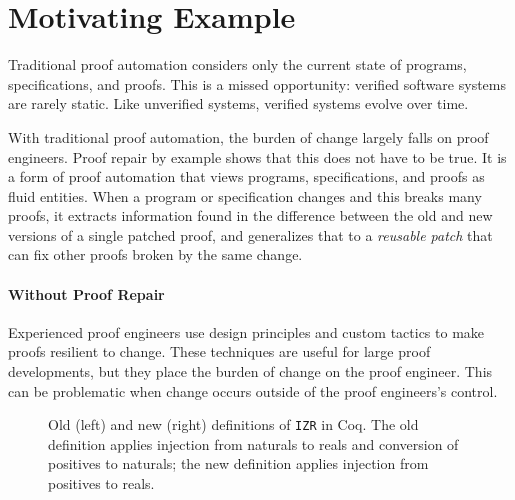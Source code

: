 \section{Motivating Example}
\label{sec:patch-motivating}


Traditional proof automation considers only the current state of programs, specifications, and proofs.
This is a missed opportunity: verified software systems are rarely static.
Like unverified systems, verified systems evolve over time.

With traditional proof automation, the burden of change largely falls on proof engineers.
Proof repair by example shows that this does not have to be true.
It is a form of proof automation that views programs, specifications, and proofs as fluid entities.
When a program or specification changes and this breaks many proofs,
it extracts information found in the difference between the old and new versions of a single patched proof,
and generalizes that to a \emph{reusable patch} that can fix other proofs broken by the same change.

\paragraph{Without Proof Repair} Experienced proof engineers use design principles and custom tactics to make proofs
resilient to change. These techniques are useful for large proof developments, but they
place the burden of change on the proof engineer. This can be problematic
when change occurs outside of the proof engineers's control.

\begin{figure*}
\begin{minipage}{0.55\textwidth}
\centering
\lstset{language=coq, aboveskip=0pt, belowskip=0pt}



\end{minipage}
\hfill
\begin{minipage}{0.44\textwidth}
\centering
\lstset{language=coq, aboveskip=0pt, belowskip=0pt}



\end{minipage}
\caption[Caption]{Old (left) and new (right) definitions of \lstinline{IZR} in Coq.
The old definition applies injection from naturals to reals and conversion of positives to
naturals; the new definition applies injection from positives to reals.}
\label{fig:izr}
\end{figure*}

